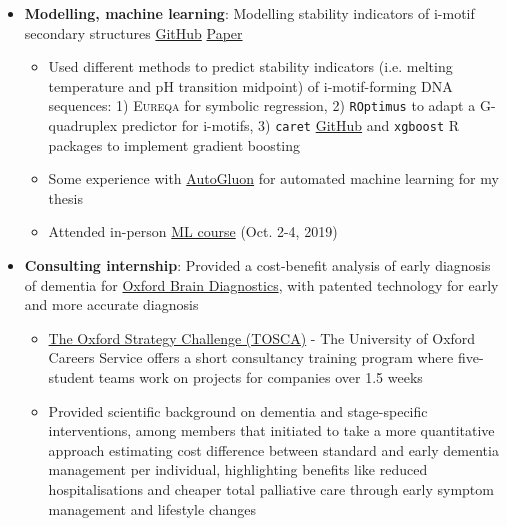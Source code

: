 \documentclass[a4paper,11pt]{article}
\newcommand{\resumeItem}[2]{
  \item\small{
    \textbf{#1}{: #2 \vspace{-2pt}}
  }
}
\newcommand{\resumeItemListStart}{\begin{itemize}}
\newcommand{\resumeItemListEnd}{\end{itemize}\vspace{-5pt}}
\begin{document}
            \resumeItemListStart
                \resumeItem{Modelling, machine learning}{Modelling stability indicators of i-motif secondary structures \href{https://github.com/SahakyanLab/iMotif_dev}{GitHub} \href{https://doi.org/10.1002/anie.202016801}{Paper}}
                    \begin{itemize}
                        \item {Used different methods to predict stability indicators (i.e. melting temperature and pH transition midpoint) of i-motif-forming DNA sequences: 1) \textsc{Eureqa} for symbolic regression, 2) \texttt{ROptimus} to adapt a G-quadruplex predictor for i-motifs, 3) \texttt{caret} \href{https://github.com/liezeltamon/ml-lib}{GitHub} and \texttt{xgboost} R packages to implement gradient boosting}
                        \item {Some experience with \href{https://github.com/autogluon/autogluon}{AutoGluon} for automated machine learning for my thesis}
                        \item {Attended in-person \href{https://training.cam.ac.uk/course/bioinfo-ml}{ML course} (Oct. 2-4, 
                        2019)}
                    \end{itemize}
            \resumeItemListEnd
            
            \resumeItemListStart
                \resumeItem{Consulting internship}{Provided a cost-benefit analysis of early diagnosis of dementia for \href{https://www.oxfordbraindiagnostics.com/}{Oxford Brain Diagnostics}, with patented technology for early and more accurate diagnosis}
                    \begin{itemize}
                        \item {\href{https://www.careers.ox.ac.uk/oxford-strategy-challenge}{The Oxford Strategy Challenge (TOSCA)} - The University of Oxford Careers Service offers a short consultancy training program where five-student teams work on projects for companies over 1.5 weeks}
                        \item {Provided scientific background on dementia and stage-specific interventions, among members that initiated to take a more quantitative approach estimating cost difference between standard and early dementia management per individual, highlighting benefits like reduced hospitalisations and cheaper total palliative care through early symptom management and lifestyle changes}
                    \end{itemize}
            \resumeItemListEnd
    
\end{document}
